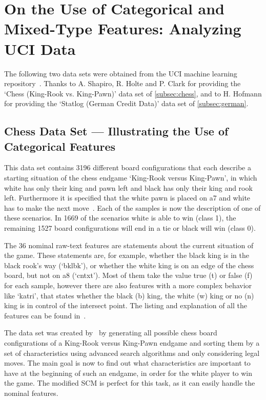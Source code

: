 \section{On the Use of Categorical and Mixed-Type Features: Analyzing UCI Data}\label{sec:uci}

The following two data sets were obtained from the UCI machine learning repository~\citep{uci}.
Thanks to A. Shapiro, R. Holte and P. Clark for providing the `Chess (King-Rook vs. King-Pawn)' data set of \autoref{subsec:chess},
and to H. Hofmann for providing the `Statlog (German Credit Data)' data set of \autoref{subsec:german}.

\subsection{Chess Data Set --- Illustrating the Use of Categorical Features}\label{subsec:chess}

This data set contains 3196 different board configurations that each describe a starting situation
of the chess endgame `King-Rook versus King-Pawn', in which white has only their
king and pawn left and black has only their king and rook left.
Furthermore it is specified that the white pawn is placed on a7 and white has to make the next move~\citep{shapiro}.
Each of the samples is now the description of one of these scenarios.
In 1669 of the scenarios white is able to win (class 1), the remaining 1527 board configurations will end in a
tie or black will win (class 0).

The 36 nominal raw-text features are statements about the current situation of the game.
These statements are, for example, whether the black king is in the black rook's way (`bklbk'),
or whether the white king is on an edge of the chess board, but not on a8 (`cntxt').
Most of them take the value true (t) or false (f) for each sample, however there are also features with
a more complex behavior like `katri', that states whether the black (b) king, the white (w) king or no (n) king
is in control of the intersect point.
The listing and explanation of all the features can be found in~\cite{shapiro}.

The data set was created by~\cite{shapiro} by generating all possible chess board configurations of a King-Rook versus King-Pawn
endgame and sorting them by a set of characteristics using advanced search algorithms and only considering legal moves.
The main goal is now to find out what characteristics are important to have at the beginning of such
an endgame, in order for the white player to win the game.
The modified SCM is perfect for this task, as it can easily handle the nominal features.

